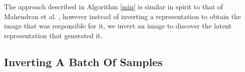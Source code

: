 \documentclass[journal]{IEEEtran}
\begin{document}
The approach described in Algorithm \ref{min} is similar in spirit to that of Mahendran et al. \cite{mahendran2015understanding}, however instead of inverting a representation to obtain the image that was responsible for it, we invert an image to discover the latent representation that generated it. %




\subsection{Inverting A Batch Of Samples}
\label{sec:batch}

\end{document}
